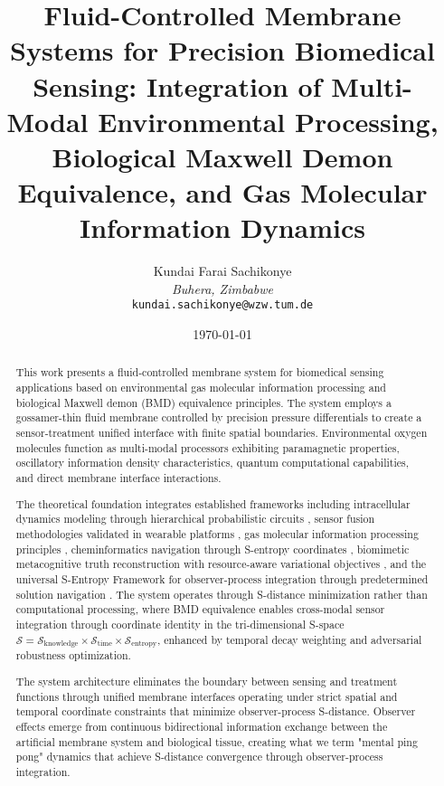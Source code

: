 \documentclass[12pt,a4paper]{article}
\title{\textbf{Fluid-Controlled Membrane Systems for Precision Biomedical Sensing: Integration of Multi-Modal Environmental Processing, Biological Maxwell Demon Equivalence, and Gas Molecular Information Dynamics}}
\author{
Kundai Farai Sachikonye\\
\textit{Buhera, Zimbabwe}\\
\texttt{kundai.sachikonye@wzw.tum.de}
}
\date{\today}
\begin{document}
\maketitle

\begin{abstract}
This work presents a fluid-controlled membrane system for biomedical sensing applications based on environmental gas molecular information processing and biological Maxwell demon (BMD) equivalence principles. The system employs a gossamer-thin fluid membrane controlled by precision pressure differentials to create a sensor-treatment unified interface with finite spatial boundaries. Environmental oxygen molecules function as multi-modal processors exhibiting paramagnetic properties, oscillatory information density characteristics, quantum computational capabilities, and direct membrane interface interactions.

The theoretical foundation integrates established frameworks including intracellular dynamics modeling through hierarchical probabilistic circuits \cite{sachikonye2024intracellular}, sensor fusion methodologies validated in wearable platforms \cite{sachikonye2024sensor}, gas molecular information processing principles \cite{sachikonye2024perception}, cheminformatics navigation through S-entropy coordinates \cite{sachikonye2024borgia}, biomimetic metacognitive truth reconstruction with resource-aware variational objectives \cite{honjo2024masamune}, and the universal S-Entropy Framework for observer-process integration through predetermined solution navigation \cite{sachikonye2024stellas}. The system operates through S-distance minimization rather than computational processing, where BMD equivalence enables cross-modal sensor integration through coordinate identity in the tri-dimensional S-space $\mathcal{S} = \mathcal{S}_{\text{knowledge}} \times \mathcal{S}_{\text{time}} \times \mathcal{S}_{\text{entropy}}$, enhanced by temporal decay weighting and adversarial robustness optimization.

The system architecture eliminates the boundary between sensing and treatment functions through unified membrane interfaces operating under strict spatial and temporal coordinate constraints that minimize observer-process S-distance. Observer effects emerge from continuous bidirectional information exchange between the artificial membrane system and biological tissue, creating what we term "mental ping pong" dynamics that achieve S-distance convergence through observer-process integration.


\end{abstract}
\end{document}
